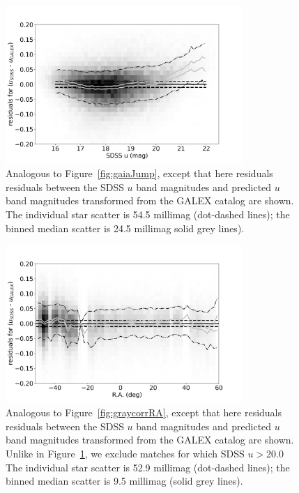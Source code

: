 \documentclass[fleqn,usenatbib]{mnras}
\begin{document}
\begin{figure}[th!]
    \centering\includegraphics[width=9cm]{figures/colorResidGALEXug_du_est_umag_Hess.png}
\caption{Analogous to Figure~\ref{fig:gaiaJump}, except that here
  residuals residuals between the SDSS $u$ band magnitudes and
  predicted $u$ band magnitudes transformed from the GALEX catalog are
  shown.  The individual star scatter is 54.5 millimag (dot-dashed
  lines); the binned median scatter is 24.5 millimag solid grey
  lines).
}
\label{fig:GALEX_umag}
\end{figure}



\begin{figure}[th!]
    \centering\includegraphics[width=9cm]{figures/colorResidGALEXbright_du_est_RA_Hess.png}
\caption{Analogous to Figure~\ref{fig:graycorrRA}, except that here
  residuals residuals between the SDSS $u$ band magnitudes and
  predicted $u$ band magnitudes transformed from the GALEX catalog are
  shown.  Unlike in Figure~\ref{fig:GALEX_umag}, we exclude matches for
  which SDSS $u$$>$20.0 The individual star scatter is 52.9 millimag
  (dot-dashed lines); the binned median scatter is 9.5 millimag (solid
  grey lines).
}
\label{fig:GALEX_RA}
\end{figure}
\end{document}
